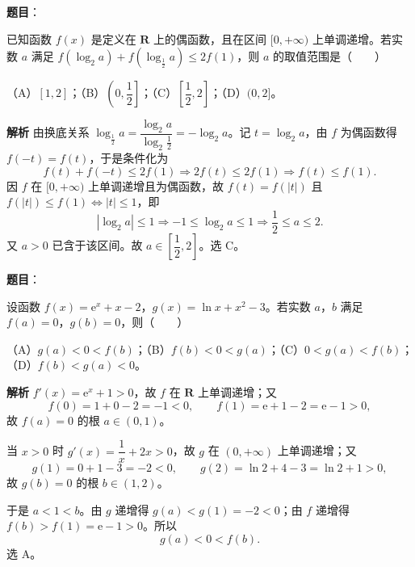 \begin{answer}

\textbf{题目}：

已知函数 $f(x)$ 是定义在 $\mathbf R$ 上的偶函数，且在区间 $[0,+\infty)$ 上单调递增。若实数 $a$ 满足 $f(\log_2 a)+f\left(\log_{\frac12}a\right)\leqslant2f(1)$，则 $a$ 的取值范围是\mbox{（　　）}

（A）$[1,2]$；（B）$\left(0,\dfrac12\right]$；（C）$\left[\dfrac12,2\right]$；（D）$(0,2]$。

\textbf{解析}
由换底关系 $\log_{\frac12}a=\dfrac{\log_2 a}{\log_2\frac12}=-\log_2 a$。记 $t=\log_2 a$，由 $f$ 为偶函数得 $f(-t)=f(t)$，于是条件化为
\nopagebreak[4]
\[f(t)+f(-t)\leqslant2f(1)\Longrightarrow2f(t)\leqslant2f(1)\Longrightarrow f(t)\leqslant f(1).\]
因 $f$ 在 $[0,+\infty)$ 上单调递增且为偶函数，故 $f(t)=f(|t|)$ 且 $f(|t|)\leqslant f(1)\iff|t|\leqslant1$，即
\nopagebreak[4]
\[|\log_2 a|\leqslant1\Longrightarrow-1\leqslant\log_2 a\leqslant1\Longrightarrow\frac12\leqslant a\leqslant2.\]
又 $a>0$ 已含于该区间。故 $a\in\left[\dfrac12,2\right]$。选 C。


\end{answer}
\begin{answer}

\textbf{题目}：

设函数 $f(x)=\mathrm e^x+x-2$，$g(x)=\ln x+x^2-3$。若实数 $a$，$b$ 满足 $f(a)=0$，$g(b)=0$，则\mbox{（　　）}

（A）$g(a)<0<f(b)$；（B）$f(b)<0<g(a)$；（C）$0<g(a)<f(b)$；（D）$f(b)<g(a)<0$。

\textbf{解析}
$f'(x)=\mathrm e^x+1>0$，故 $f$ 在 $\mathbf R$ 上单调递增；又
\nopagebreak[4]
\[f(0)=1+0-2=-1<0,\qquad f(1)=\mathrm e+1-2=\mathrm e-1>0,\]
故 $f(a)=0$ 的根 $a\in(0,1)$。

当 $x>0$ 时 $g'(x)=\dfrac1x+2x>0$，故 $g$ 在 $(0,+\infty)$ 上单调递增；又
\nopagebreak[4]
\[g(1)=0+1-3=-2<0,\qquad g(2)=\ln2+4-3=\ln2+1>0,\]
故 $g(b)=0$ 的根 $b\in(1,2)$。

于是 $a<1<b$。由 $g$ 递增得 $g(a)<g(1)=-2<0$；由 $f$ 递增得 $f(b)>f(1)=\mathrm e-1>0$。所以
\nopagebreak[4]
\[g(a)<0<f(b).\]
选 A。


\end{answer}
